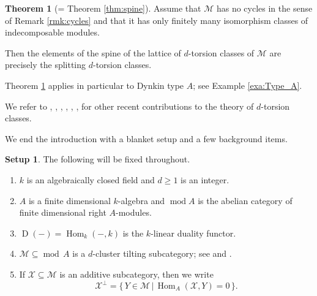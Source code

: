 \documentclass[12pt,reqno]{amsart}
\def\cM{\mathscr{M}}
\def\cX{\mathscr{X}}
\def\dual{\operatorname{D}}
\def\Hom{\operatorname{Hom}}
\def\mod{\operatorname{mod}}
\numberwithin{equation}{section}
\theoremstyle{definition}
\newtheorem{Setup}[Lemma]{Setup}
\theoremstyle{theorem}
\newtheorem{ThmIntro}{Theorem}
\theoremstyle{definition}
\begin{document}
\begin{ThmIntro}
[= Theorem \ref{thm:spine}]
\label{thm:B}
Assume that $\cM$ has no cycles in the sense of Remark \ref{rmk:cycles} and that it has only finitely many isomorphism classes of indecomposable modules.  

Then the elements of the spine of the lattice of $d$-torsion classes of $\cM$ are precisely the splitting $d$-torsion classes.
\end{ThmIntro}

Theorem \ref{thm:B} applies in particular to Dynkin type $A$; see Example \ref{exa:Type_A}.

We refer to \cite{Asadollahi-Jorgensen-Schroll-Treffinger_On-higher-torsion-classes}, \cite{August-et-al_A-characterisation-of-higher-torsion-classes}, \cite{August-et-al_Higher-torsion-classes-tau-d-tilting-theory-and-silting-complexes}, \cite{Fedele-Jorgensen-Shah_The-index-in-d-exact-categories}, \cite{Kvamme_Higher-extension-closure-and-d-exact-categories}, \cite{Segovia_P-comma-phi-Tamari-and-higher-torsion-lattices-of-type-A}, \cite{Segovia_P-comma-phi-Tamari-lattices} for other recent contributions to the theory of $d$-torsion classes.

We end the introduction with a blanket setup and a few background items.


\begin{Setup}
The following will be fixed throughout.
\begin{enumerate}
\setlength\itemsep{4pt}

  \item  $k$ is an algebraically closed field and $d \geqslant 1$ is an integer.
  
  \item  $A$ is a finite dimensional $k$-algebra and $\mod A$ is the abelian category of finite dimensional right $A$-modules.
  
  \item  $\dual( - ) = \Hom_k( -,k )$ is the $k$-linear duality functor.

  \item  $\cM \subseteq \mod\,A$ is a $d$-cluster tilting subcategory; see \cite[def.\ 2.2]{Iyama_Higher-dimensional-AR-theory} and \cite[def.\ 3.14]{Jasso_n-abelian}.   
  
  \item  If $\cX \subseteq \cM$ is an additive subcategory, then we write
\[
  \cX^{ \perp }
  = \{\, Y \in \cM \,|\, \Hom_A( \cX,Y ) = 0 \,\}.
\]

\end{enumerate}
\end{Setup}
\end{document}

